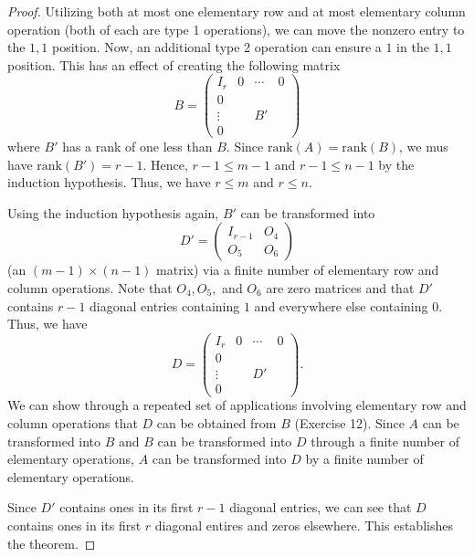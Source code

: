 \begin{proof}
    Utilizing both at most one elementary row and at most elementary column operation (both of each are type 1 operations), we can move the nonzero entry to the \( 1,1 \) position. Now, an additional type 2 operation can ensure a \( 1  \) in the \( 1,1  \) position. This has an effect of creating the following matrix
    \[  B = \begin{pmatrix} 
        {I}_{r} & 0 & \cdots & 0  \\
        0  &  \\
        \vdots & & B' &   \\
        0 &    &
              \end{pmatrix} \]
where \( B'  \) has a rank of one less than \( B  \). Since \( \text{rank}(A ) = \text{rank}(B)  \), we mus have \( \text{rank}(B') = r - 1  \). Hence, \( r -1 \leq m - 1  \) and \( r - 1 \leq n - 1  \) by the induction hypothesis. Thus, we have \( r \leq  m  \) and \( r \leq n \).
    
Using the induction hypothesis again, \( B' \) can be transformed into 
\[  D' = \begin{pmatrix} 
    {I}_{r-1} & {O}_{4} \\
    {O}_{5} & {O}_{6}
          \end{pmatrix}  \] (an \( (m-1) \times (n-1) \) matrix) via a finite number of elementary row and column operations. Note that \( {O}_{4}, {O}_{5},  \) and \( {O}_{6} \) are zero matrices and that \( D'  \) contains \( r - 1  \) diagonal entries containing \( 1  \) and everywhere else containing \( 0  \). Thus, we have 
          \[  D = \begin{pmatrix} 
        {I}_{r} & 0 & \cdots & 0  \\
        0  &  \\
        \vdots & & D' &   \\
        0 &    &
                    \end{pmatrix}.   \]
                    We can show through a repeated set of applications involving elementary row and column operations that \( D  \) can be obtained from \( B  \) (Exercise 12). Since \( A  \) can be transformed into \( B  \) and \( B  \) can be transformed into \( D  \) through a finite number of elementary operations, \( A  \) can be transformed into \( D  \) by a finite number of elementary operations.

    Since \( D'  \) contains ones in its first \( r - 1  \) diagonal entries, we can see that \( D  \) contains ones in its first \( r  \) diagonal entires and zeros elsewhere. This establishes the theorem.
\end{proof}


